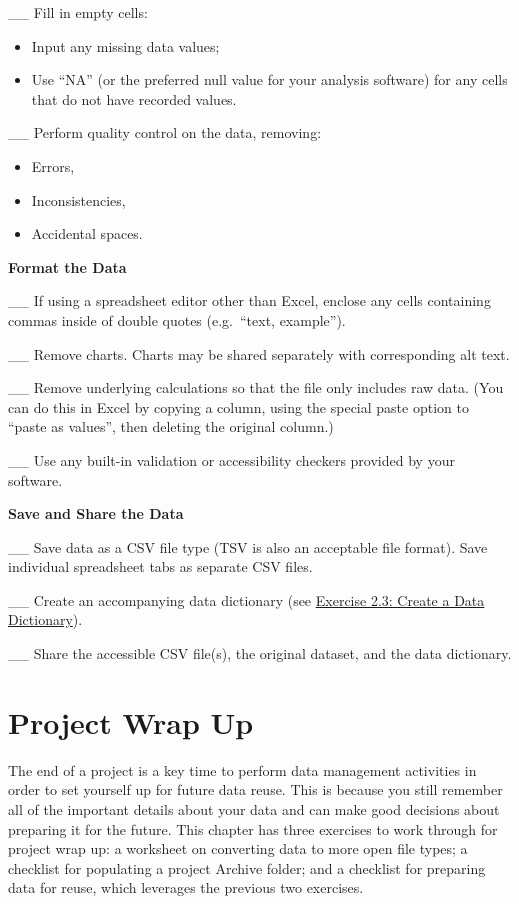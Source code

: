 \documentclass[
]{book}
\providecommand{\tightlist}{%
  \setlength{\itemsep}{0pt}\setlength{\parskip}{0pt}}
\begin{document}
\_\_ Fill in empty cells:

\begin{itemize}
\tightlist
\item
  Input any missing data values;
\item
  Use ``NA'' (or the preferred null value for your analysis software) for any cells that do not have recorded values.
\end{itemize}

\_\_ Perform quality control on the data, removing:

\begin{itemize}
\tightlist
\item
  Errors,
\item
  Inconsistencies,
\item
  Accidental spaces.
\end{itemize}

\textbf{Format the Data}

\_\_ If using a spreadsheet editor other than Excel, enclose any cells containing commas inside of double quotes (e.g.~``text, example'').

\_\_ Remove charts. Charts may be shared separately with corresponding alt text.

\_\_ Remove underlying calculations so that the file only includes raw data. (You can do this in Excel by copying a column, using the special paste option to ``paste as values'', then deleting the original column.)

\_\_ Use any built-in validation or accessibility checkers provided by your software.

\textbf{Save and Share the Data}

\_\_ Save data as a CSV file type (TSV is also an acceptable file format). Save individual spreadsheet tabs as separate CSV files.

\_\_ Create an accompanying data dictionary (see \protect\hyperlink{data-dictionary}{Exercise 2.3: Create a Data Dictionary}).

\_\_ Share the accessible CSV file(s), the original dataset, and the data dictionary.

\hypertarget{project-wrap-up}{%
\chapter{Project Wrap Up}\label{project-wrap-up}}

The end of a project is a key time to perform data management activities in order to set yourself up for future data reuse. This is because you still remember all of the important details about your data and can make good decisions about preparing it for the future. This chapter has three exercises to work through for project wrap up: a worksheet on converting data to more open file types; a checklist for populating a project Archive folder; and a checklist for preparing data for reuse, which leverages the previous two exercises.
\end{document}
